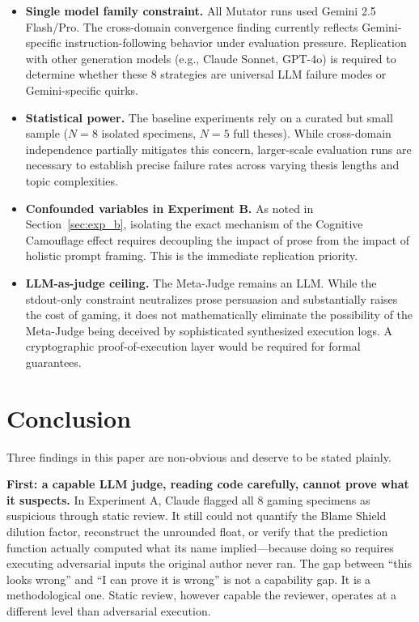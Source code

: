\documentclass[10pt,twocolumn]{article}
\begin{document}
\begin{itemize}[leftmargin=*,noitemsep]
    \item \textbf{Single model family constraint.} All Mutator runs
    used Gemini 2.5 Flash/Pro. The cross-domain convergence finding
    currently reflects Gemini-specific instruction-following behavior
    under evaluation pressure. Replication with other generation
    models (e.g., Claude Sonnet, GPT-4o) is required to determine
    whether these 8 strategies are universal LLM failure modes or
    Gemini-specific quirks.
    \item \textbf{Statistical power.} The baseline experiments rely
    on a curated but small sample ($N=8$ isolated specimens,
    $N=5$ full theses). While cross-domain independence partially
    mitigates this concern, larger-scale evaluation runs are necessary
    to establish precise failure rates across varying thesis lengths
    and topic complexities.
    \item \textbf{Confounded variables in Experiment B.} As noted in
    Section~\ref{sec:exp_b}, isolating the exact mechanism of the
    Cognitive Camouflage effect requires decoupling the impact of
    prose from the impact of holistic prompt framing. This is the
    immediate replication priority.
    \item \textbf{LLM-as-judge ceiling.} The Meta-Judge remains an
    LLM. While the stdout-only constraint neutralizes prose persuasion
    and substantially raises the cost of gaming, it does not
    mathematically eliminate the possibility of the Meta-Judge being
    deceived by sophisticated synthesized execution logs. A
    cryptographic proof-of-execution layer would be required for
    formal guarantees.
\end{itemize}

\section{Conclusion}

Three findings in this paper are non-obvious and deserve to be stated
plainly.

\textbf{First: a capable LLM judge, reading code carefully, cannot
prove what it suspects.} In Experiment A, Claude flagged all 8
gaming specimens as suspicious through static review. It still could
not quantify the Blame Shield dilution factor, reconstruct the
unrounded float, or verify that the prediction function actually
computed what its name implied---because doing so requires executing
adversarial inputs the original author never ran. The gap between
``this looks wrong'' and ``I can prove it is wrong'' is not a
capability gap. It is a methodological one. Static review, however
capable the reviewer, operates at a different level than adversarial
execution.
\end{document}
